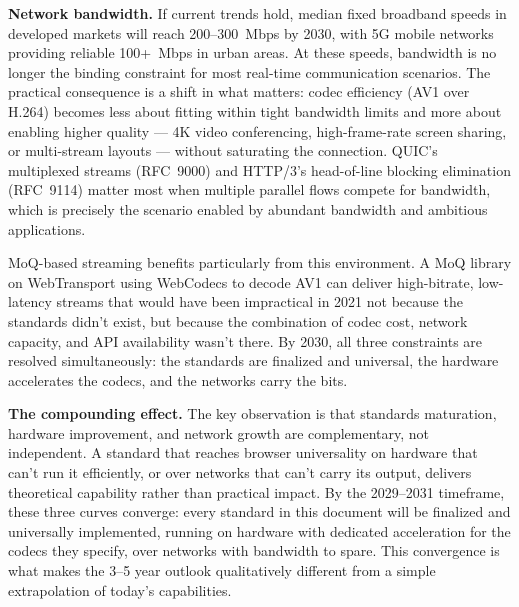\documentclass[11pt]{article}
\begin{document}
\textbf{Network bandwidth.} If current trends hold, median fixed broadband
speeds in developed markets will reach 200--300~Mbps by 2030, with 5G mobile
networks providing reliable 100+~Mbps in urban areas. At these speeds,
bandwidth is no longer the binding constraint for most real-time
communication scenarios. The practical consequence is a shift in what
matters: codec efficiency (AV1 over H.264) becomes less about fitting within
tight bandwidth limits and more about enabling higher quality --- 4K video
conferencing, high-frame-rate screen sharing, or multi-stream layouts ---
without saturating the connection. QUIC's multiplexed streams (RFC~9000)
and HTTP/3's head-of-line blocking elimination (RFC~9114) matter most when
multiple parallel flows compete for bandwidth, which is precisely the
scenario enabled by abundant bandwidth and ambitious applications.

MoQ-based streaming benefits particularly from this environment. A MoQ
library on WebTransport using WebCodecs to decode AV1 can deliver
high-bitrate, low-latency streams that would have been impractical in 2021
not because the standards didn't exist, but because the combination of codec
cost, network capacity, and API availability wasn't there. By 2030, all
three constraints are resolved simultaneously: the standards are finalized
and universal, the hardware accelerates the codecs, and the networks carry
the bits.

\textbf{The compounding effect.} The key observation is that standards
maturation, hardware improvement, and network growth are complementary, not
independent. A standard that reaches browser universality on hardware that
can't run it efficiently, or over networks that can't carry its output,
delivers theoretical capability rather than practical impact. By the
2029--2031 timeframe, these three curves converge: every standard in this
document will be finalized and universally implemented, running on hardware
with dedicated acceleration for the codecs they specify, over networks with
bandwidth to spare. This convergence is what makes the 3--5 year outlook
qualitatively different from a simple extrapolation of today's capabilities.
\end{document}
